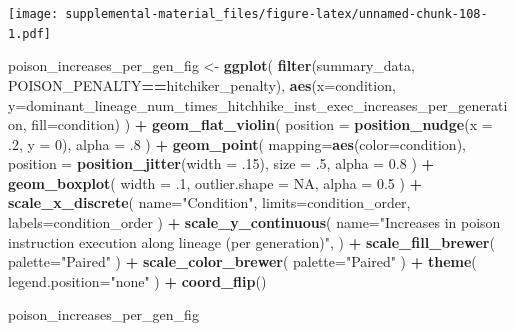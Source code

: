 \documentclass[]{book}
\newenvironment{Shaded}{\begin{snugshade}}{\end{snugshade}}
\newcommand{\DataTypeTok}[1]{\textcolor[rgb]{0.13,0.29,0.53}{#1}}
\newcommand{\DecValTok}[1]{\textcolor[rgb]{0.00,0.00,0.81}{#1}}
\newcommand{\FloatTok}[1]{\textcolor[rgb]{0.00,0.00,0.81}{#1}}
\newcommand{\KeywordTok}[1]{\textcolor[rgb]{0.13,0.29,0.53}{\textbf{#1}}}
\newcommand{\NormalTok}[1]{#1}
\newcommand{\OperatorTok}[1]{\textcolor[rgb]{0.81,0.36,0.00}{\textbf{#1}}}
\newcommand{\OtherTok}[1]{\textcolor[rgb]{0.56,0.35,0.01}{#1}}
\newcommand{\StringTok}[1]{\textcolor[rgb]{0.31,0.60,0.02}{#1}}
\begin{document}
\texttt{[image: supplemental-material\_files/figure-latex/unnamed-chunk-108-1.pdf]}

\begin{Shaded}
\begin{Highlighting}[]
\NormalTok{poison_increases_per_gen_fig <-}\StringTok{ }\KeywordTok{ggplot}\NormalTok{(}
    \KeywordTok{filter}\NormalTok{(summary_data, POISON_PENALTY}\OperatorTok{==}\NormalTok{hitchiker_penalty),}
    \KeywordTok{aes}\NormalTok{(}\DataTypeTok{x=}\NormalTok{condition, }\DataTypeTok{y=}\NormalTok{dominant_lineage_num_times_hitchhike_inst_exec_increases_per_generation, }\DataTypeTok{fill=}\NormalTok{condition)}
\NormalTok{  ) }\OperatorTok{+}
\StringTok{  }\KeywordTok{geom_flat_violin}\NormalTok{(}
    \DataTypeTok{position =} \KeywordTok{position_nudge}\NormalTok{(}\DataTypeTok{x =} \FloatTok{.2}\NormalTok{, }\DataTypeTok{y =} \DecValTok{0}\NormalTok{),}
    \DataTypeTok{alpha =} \FloatTok{.8}
\NormalTok{  ) }\OperatorTok{+}
\StringTok{  }\KeywordTok{geom_point}\NormalTok{(}
    \DataTypeTok{mapping=}\KeywordTok{aes}\NormalTok{(}\DataTypeTok{color=}\NormalTok{condition),}
    \DataTypeTok{position =} \KeywordTok{position_jitter}\NormalTok{(}\DataTypeTok{width =} \FloatTok{.15}\NormalTok{),}
    \DataTypeTok{size =} \FloatTok{.5}\NormalTok{,}
    \DataTypeTok{alpha =} \FloatTok{0.8}
\NormalTok{  ) }\OperatorTok{+}
\StringTok{  }\KeywordTok{geom_boxplot}\NormalTok{(}
    \DataTypeTok{width =} \FloatTok{.1}\NormalTok{,}
    \DataTypeTok{outlier.shape =} \OtherTok{NA}\NormalTok{,}
    \DataTypeTok{alpha =} \FloatTok{0.5}
\NormalTok{  ) }\OperatorTok{+}
\StringTok{  }\KeywordTok{scale_x_discrete}\NormalTok{(}
    \DataTypeTok{name=}\StringTok{"Condition"}\NormalTok{,}
    \DataTypeTok{limits=}\NormalTok{condition_order,}
    \DataTypeTok{labels=}\NormalTok{condition_order}
\NormalTok{  ) }\OperatorTok{+}
\StringTok{  }\KeywordTok{scale_y_continuous}\NormalTok{(}
    \DataTypeTok{name=}\StringTok{"Increases in poison instruction execution along lineage (per generation)"}\NormalTok{,}
\NormalTok{  ) }\OperatorTok{+}
\StringTok{  }\KeywordTok{scale_fill_brewer}\NormalTok{(}
    \DataTypeTok{palette=}\StringTok{"Paired"}
\NormalTok{  ) }\OperatorTok{+}
\StringTok{  }\KeywordTok{scale_color_brewer}\NormalTok{(}
    \DataTypeTok{palette=}\StringTok{"Paired"}
\NormalTok{  ) }\OperatorTok{+}
\StringTok{  }\KeywordTok{theme}\NormalTok{(}
    \DataTypeTok{legend.position=}\StringTok{"none"}
\NormalTok{  ) }\OperatorTok{+}
\StringTok{  }\KeywordTok{coord_flip}\NormalTok{()}

\NormalTok{poison_increases_per_gen_fig}
\end{Highlighting}
\end{Shaded}
\end{document}
